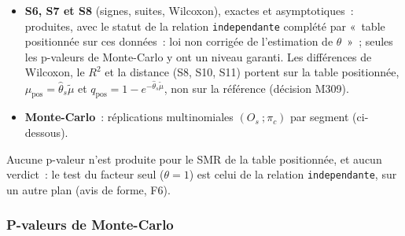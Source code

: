 \documentclass[a4paper,11pt]{article}
\newcommand{\code}[1]{\texttt{\small #1}}
\begin{document}
\begin{itemize}[leftmargin=*, itemsep=2pt]
    $\mathcal{B}(O_s, \pi_{b,s})$, calculée par convolution
    (\code{loi\_somme\_binomiales()}), bornes non produites (état
    \code{bornes\_non\_definies})~; la convolution n'est faite que si son
    nombre de produits, calculé avant elle
    (\code{cout\_convolution\_binomiales()}), est au plus
    \code{N\_MAX\_PRODUITS\_CONVOLUTION} ($10^8$, \code{R/validation.R},
    l.~115), sinon p-valeurs et bornes valent \code{NA}, état
    \code{convolution\_au\_dela\_n\_max} (l'issue~\#178 propose une
    p-valeur asymptotique au-delà)~; le regroupement \code{segment}, et
    tout sous-groupe qui contient, pour chaque segment qu'il touche, toutes
    les cellules retenues de ce segment, ont un $O_b$ déterminé par les
    $O_s$~: SMR descriptif, bornes et p-valeurs non produites, état
    \code{contraint\_par\_positionnement}. Les états d'une ligne de
    sous-groupe forment \code{ETATS\_SOUS\_GROUPES\_VALIDATION}~:
    \code{produite}, \code{ddl\_non\_etabli}, \code{aucune\_cellule\_retenue}
    et, sous \code{positionnee} seulement, les trois états ci-dessus.
  \item \textbf{S6, S7 et S8} (signes, suites, Wilcoxon), exactes et
    asymptotiques~: produites, avec le statut de la relation
    \code{independante} complété par «~table positionnée sur ces données~:
    loi non corrigée de l'estimation de $\theta$~»~; seules les p-valeurs
    de Monte-Carlo y ont un niveau garanti. Les différences de Wilcoxon, le
    $R^2$ et la distance (S8, S10, S11) portent sur la table positionnée,
    $\mu_{\mathrm{pos}} = \hat\theta_s \tilde\mu$ et $q_{\mathrm{pos}} = 1 -
    e^{-\hat\theta_s \tilde\mu}$, non sur la référence (décision M309).
  \item \textbf{Monte-Carlo}~: réplications multinomiales
    $(O_s~; \pi_c)$ par segment (ci-dessous).
\end{itemize}
Aucune p-valeur n'est produite pour le SMR de la table positionnée, et
aucun verdict~: le test du facteur seul ($\theta = 1$) est celui de la
relation \code{independante}, sur un autre plan (avis de forme, F6).

\subsubsection*{P-valeurs de Monte-Carlo}
\label{sec:validation-monte-carlo}
\end{document}
